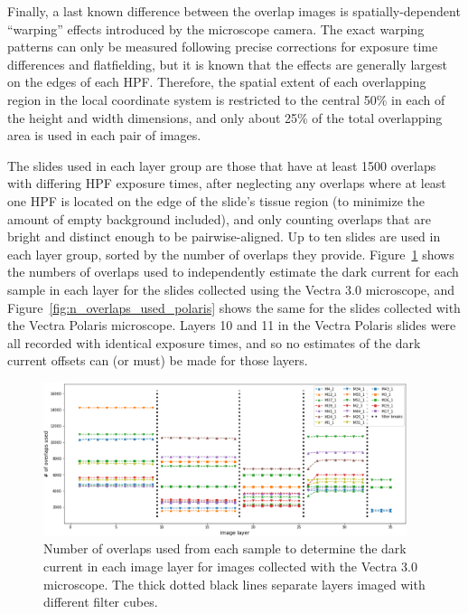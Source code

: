 \documentclass[letterpaper,11pt]{article}
\newcommand{\reffig}[1]{Figure~\ref{#1}}
\begin{document}

Finally, a last known difference between the overlap images is spatially-dependent ``warping'' effects introduced by the microscope camera. The exact warping patterns can only be measured following precise corrections for exposure time differences and flatfielding, but it is known that the effects are generally largest on the edges of each HPF. Therefore, the spatial extent of each overlapping region in the local coordinate system is restricted to the central 50\% in each of the height and width dimensions, and only about 25\% of the total overlapping area is used in each pair of images.


The slides used in each layer group are those that have at least 1500 overlaps with differing HPF exposure times, after neglecting any overlaps where at least one HPF is located on the edge of the slide's tissue region (to minimize the amount of empty background included), and only counting overlaps that are bright and distinct enough to be pairwise-aligned. Up to ten slides are used in each layer group, sorted by the number of overlaps they provide. \reffig{fig:n_overlaps_used_vectra} shows the numbers of overlaps used to independently estimate the dark current for each sample in each layer for the slides collected using the Vectra 3.0 microscope, and \reffig{fig:n_overlaps_used_polaris} shows the same for the slides collected with the Vectra Polaris microscope. Layers 10 and 11 in the Vectra Polaris slides were all recorded with identical exposure times, and so no estimates of the dark current offsets can (or must) be made for those layers. 

\begin{figure}[!ht]
\centering
\includegraphics[width=0.95\textwidth]{images/methods/n_overlaps_used_vectra}
\caption{\footnotesize Number of overlaps used from each sample to determine the dark current in each image layer for images collected with the Vectra 3.0 microscope. The thick dotted black lines separate layers imaged with different filter cubes.}
\label{fig:n_overlaps_used_vectra}
\end{figure}
\end{document}
